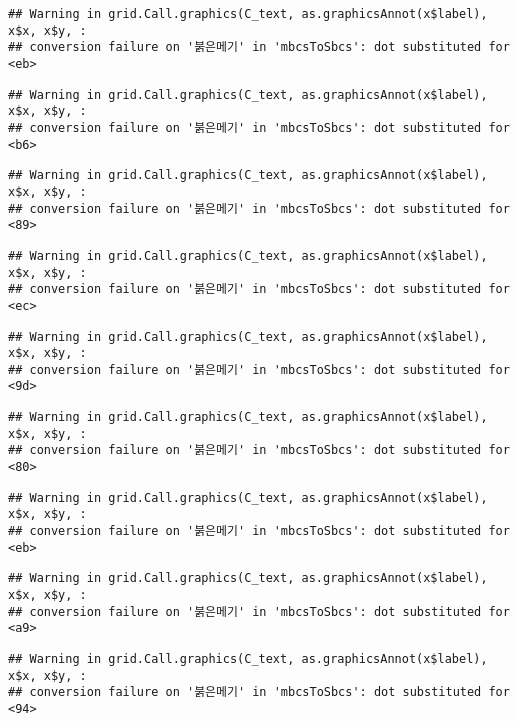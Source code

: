 \documentclass[
]{article}
\begin{document}
\begin{verbatim}
## Warning in grid.Call.graphics(C_text, as.graphicsAnnot(x$label), x$x, x$y, :
## conversion failure on '붉은메기' in 'mbcsToSbcs': dot substituted for <eb>
\end{verbatim}

\begin{verbatim}
## Warning in grid.Call.graphics(C_text, as.graphicsAnnot(x$label), x$x, x$y, :
## conversion failure on '붉은메기' in 'mbcsToSbcs': dot substituted for <b6>
\end{verbatim}

\begin{verbatim}
## Warning in grid.Call.graphics(C_text, as.graphicsAnnot(x$label), x$x, x$y, :
## conversion failure on '붉은메기' in 'mbcsToSbcs': dot substituted for <89>
\end{verbatim}

\begin{verbatim}
## Warning in grid.Call.graphics(C_text, as.graphicsAnnot(x$label), x$x, x$y, :
## conversion failure on '붉은메기' in 'mbcsToSbcs': dot substituted for <ec>
\end{verbatim}

\begin{verbatim}
## Warning in grid.Call.graphics(C_text, as.graphicsAnnot(x$label), x$x, x$y, :
## conversion failure on '붉은메기' in 'mbcsToSbcs': dot substituted for <9d>
\end{verbatim}

\begin{verbatim}
## Warning in grid.Call.graphics(C_text, as.graphicsAnnot(x$label), x$x, x$y, :
## conversion failure on '붉은메기' in 'mbcsToSbcs': dot substituted for <80>
\end{verbatim}

\begin{verbatim}
## Warning in grid.Call.graphics(C_text, as.graphicsAnnot(x$label), x$x, x$y, :
## conversion failure on '붉은메기' in 'mbcsToSbcs': dot substituted for <eb>
\end{verbatim}

\begin{verbatim}
## Warning in grid.Call.graphics(C_text, as.graphicsAnnot(x$label), x$x, x$y, :
## conversion failure on '붉은메기' in 'mbcsToSbcs': dot substituted for <a9>
\end{verbatim}

\begin{verbatim}
## Warning in grid.Call.graphics(C_text, as.graphicsAnnot(x$label), x$x, x$y, :
## conversion failure on '붉은메기' in 'mbcsToSbcs': dot substituted for <94>
\end{verbatim}
\end{document}
